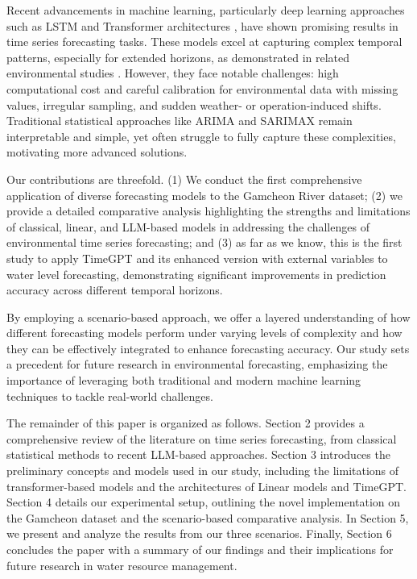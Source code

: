 \documentclass[a4paper,twoside,flushend, 10pt]{article}
\begin{document}
Recent advancements in machine learning, particularly deep learning approaches such as LSTM \cite{HS1997} and Transformer architectures \cite{VSP17}, have shown promising results in time series forecasting tasks. These models excel at capturing complex temporal patterns, especially for extended horizons, as demonstrated in related environmental studies \cite{XFL23}. However, they face notable challenges: high computational cost and careful calibration for environmental data with missing values, irregular sampling, and sudden weather- or operation-induced shifts. Traditional statistical approaches like ARIMA and SARIMAX \cite{BJ2015} remain interpretable and simple, yet often struggle to fully capture these complexities, motivating more advanced solutions.

Our contributions are threefold. (1) We conduct the first comprehensive application of diverse forecasting models to the Gamcheon River dataset; (2) we provide a detailed comparative analysis highlighting the strengths and limitations of classical, linear, and LLM-based models in addressing the challenges of environmental time series forecasting; and (3) as far as we know, this is the first study to apply TimeGPT and its enhanced version with external variables to water level forecasting, demonstrating significant improvements in prediction accuracy across different temporal horizons.

By employing a scenario-based approach, we offer a layered understanding of how different forecasting models perform under varying levels of complexity and how they can be effectively integrated to enhance forecasting accuracy. Our study sets a precedent for future research in environmental forecasting, emphasizing the importance of leveraging both traditional and modern machine learning techniques to tackle real-world challenges.

The remainder of this paper is organized as follows. Section 2 provides a comprehensive review of the literature on time series forecasting, from classical statistical methods to recent LLM-based approaches. Section 3 introduces the preliminary concepts and models used in our study, including the limitations of transformer-based models and the architectures of Linear models and TimeGPT. Section 4 details our experimental setup, outlining the novel implementation on the Gamcheon dataset and the scenario-based comparative analysis. In Section 5, we present and analyze the results from our three scenarios. Finally, Section 6 concludes the paper with a summary of our findings and their implications for future research in water resource management.
\end{document}
